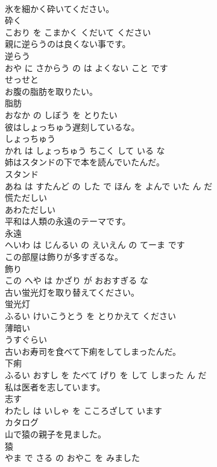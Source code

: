 \documentclass[8pt]{extreport}
\begin{document}
\begin{CJK}{UTF8}{min}
\\	氷を細かく砕いてください。	
\\	砕く 
\\	こおり を こまかく くだいて ください			
\\	親に逆らうのは良くない事です。	
\\	逆らう 
\\	おや に さからう の は よくない こと です			
\\	せっせと	
\\	お腹の脂肪を取りたい。	
\\	脂肪 
\\	おなか の しぼう を とりたい			
\\	彼はしょっちゅう遅刻しているな。	
\\	しょっちゅう 
\\	かれ は しょっちゅう ちこく して いる な			
\\	姉はスタンドの下で本を読んでいたんだ。	
\\	スタンド 
\\	あね は すたんど の した で ほん を よんで いた ん だ			
\\	慌ただしい	
\\	あわただしい			
\\	平和は人類の永遠のテーマです。	
\\	永遠 
\\	へいわ は じんるい の えいえん の てーま です			
\\	この部屋は飾りが多すぎるな。	
\\	飾り 
\\	この へや は かざり が おおすぎる な			
\\	古い蛍光灯を取り替えてください。	
\\	蛍光灯 
\\	ふるい けいこうとう を とりかえて ください			
\\	薄暗い	
\\	うすぐらい			
\\	古いお寿司を食べて下痢をしてしまったんだ。	
\\	下痢 
\\	ふるい おすし を たべて げり を して しまった ん だ			
\\	私は医者を志しています。	
\\	志す 
\\	わたし は いしゃ を こころざして います			
\\	カタログ	
\\	山で猿の親子を見ました。	
\\	猿 
\\	やま で さる の おやこ を みました			

\end{CJK}
\end{document}

